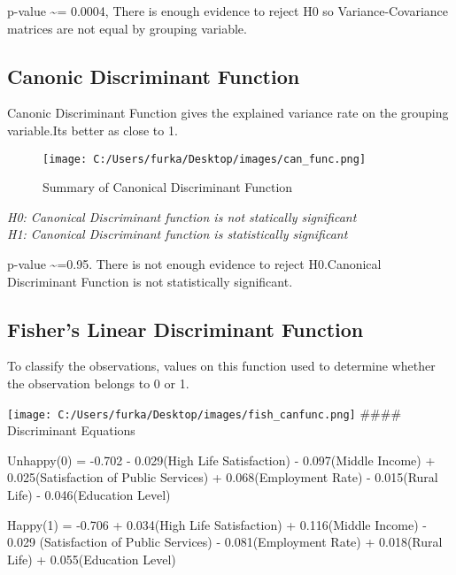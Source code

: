 \documentclass[12pt,twoside]{deuthesis}
\begin{document}
p-value \textasciitilde= 0.0004, There is enough evidence to reject H0 so Variance-Covariance matrices are not equal by grouping variable.

\hypertarget{canonic-discriminant-function}{%
\subsection{Canonic Discriminant Function}\label{canonic-discriminant-function}}

Canonic Discriminant Function gives the explained variance rate on the grouping variable.Its better as close to 1.
\begin{figure}
\centering
\texttt{[image: C:/Users/furka/Desktop/images/can\_func.png]}
\caption{Summary of Canonical Discriminant Function}
\end{figure}
\emph{H0: Canonical Discriminant function is not statically significant}\\
\setlength{\parindent}{0in}
\emph{H1: Canonical Discriminant function is statistically significant}

p-value \textasciitilde=0.95. There is not enough evidence to reject H0.Canonical Discriminant Function is not statistically significant.

\hypertarget{fishers-linear-discriminant-function}{%
\subsection{Fisher's Linear Discriminant Function}\label{fishers-linear-discriminant-function}}

To classify the observations, values on this function used to determine whether the observation belongs to 0 or 1.

\texttt{[image: C:/Users/furka/Desktop/images/fish\_canfunc.png]}
\#\#\#\# Discriminant Equations

Unhappy(0) = -0.702 - 0.029(High Life Satisfaction) - 0.097(Middle Income) +
0.025(Satisfaction of Public Services) + 0.068(Employment Rate) - 0.015(Rural Life)
- 0.046(Education Level)\\

\setlength{\parindent}{0in}

Happy(1) = -0.706 + 0.034(High Life Satisfaction) + 0.116(Middle Income) -
0.029 (Satisfaction of Public Services) - 0.081(Employment Rate) + 0.018(Rural Life)
+ 0.055(Education Level)
\end{document}
